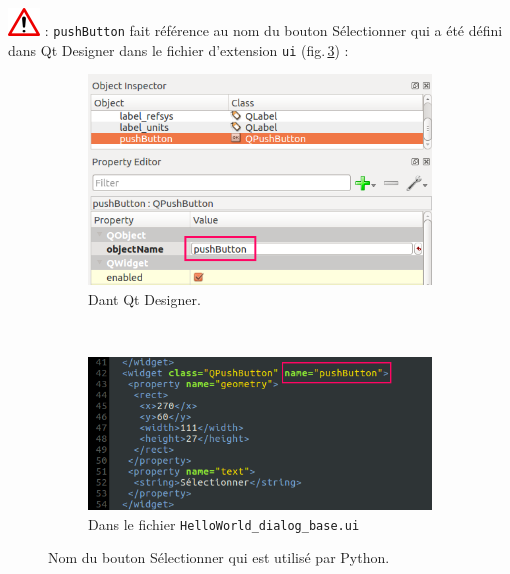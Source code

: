 \documentclass[11pt]{article}
\begin{document}
\begin{enumerate}
\includegraphics[scale=1]{warningt.png} \underline{}: \og{}\texttt{pushButton}\fg{} fait référence au nom du bouton \og{}Sélectionner\fg{} qui a été défini dans \og{}Qt Designer\fg{} dans le fichier d'extension \og{}\texttt{ui}\fg{} (fig.\,\ref{pushbutton}) : 
\vspace*{-0.4em}
\begin{figure}[H]
    \centering
    \begin{subfigure}[t]{0.44\textwidth}
    \centering
    	\includegraphics[width=1\textwidth]{qtpushbutton.png}
    	\caption{Dant Qt Designer.}
    	\label{pushbutton:qt}
    \end{subfigure}
    ~
    \begin{subfigure}[t]{0.44\textwidth}
    \centering
    		\includegraphics[width=1\textwidth]{push_button.png}
    	\caption{Dans le fichier \texttt{HelloWorld\_dialog\_base.ui}}
    	\label{pushbutton:ui}
    \end{subfigure}
    \vspace*{-0.64em}
    \caption[Nom du bouton \og{}Sélectionner\fg{}]{Nom du bouton \og{}Sélectionner\fg{} qui est utilisé par Python.}
    \label{pushbutton}
\end{figure}


\end{enumerate}
\end{document}
